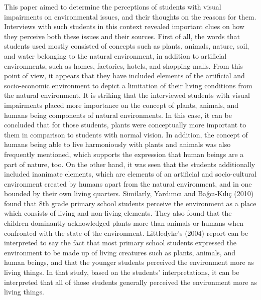 \documentclass[11.5pt]{sig-alternate} %
\begin{document}
\begin{large}
This paper aimed to determine the perceptions of students with visual impairments on environmental issues, and their thoughts on the reasons for them. Interviews with such students in this context revealed important clues on how they perceive both these issues and their sources. First of all, the words that students used mostly consisted of concepts such as plants, animals, nature, soil, and water belonging to the natural environment, in addition to artificial environments, such as homes, factories, hotels, and shopping malls. From this point of view, it appears that they have included elements of the artificial and socio-economic environment to depict a limitation of their living conditions from the natural environment. It is striking that the interviewed students with visual impairments placed more importance on the concept of plants, animals, and humans being components of natural environments. In this case, it can be concluded that for those students, plants were conceptually more important to them in comparison to students with normal vision. In addition, the concept of humans being able to live harmoniously with plants and animals was also frequently mentioned, which supports the expression that human beings are a part of nature, too. On the other hand, it was seen that the students additionally included inanimate elements, which are elements of an artificial and socio-cultural environment created by humans apart from the natural environment, and in one bounded by their own living quarters. Similarly, Yardımcı and Bağcı-Kılıç (2010) found that 8th grade primary school students perceive the environment as a place which consists of living and non-living elements. They also found that the children dominantly acknowledged plants more than animals or humans when confronted with the state of the environment. Littledyke’s (2004) report can be interpreted to say the fact that most primary school students expressed the environment to be made up of living creatures such as plants, animals, and human beings, and that the younger students perceived the environment more as living things. In that study, based on the students’ interpretations, it can be interpreted that all of those students generally perceived the environment more as living things.


\end{large}
\end{document}
